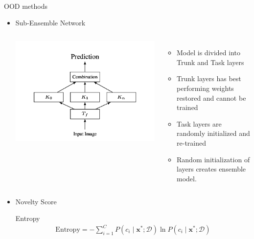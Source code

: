 \documentclass[10pt, aspectratio=169]{beamer}
\begin{document}
\begin{frame}[allowframebreaks]{OOD methods}
\begin{itemize}
\begin{itemize}
            \item Sub-Ensemble Network 
            \begin{columns}
                   \centering
                   \includegraphics[scale=0.275]{images/subensembles.png}
                    \begin{itemize}
                        \item Model is divided into Trunk and Task layers
                        \item Trunk layers has best performing weights restored and cannot be trained
                        \item Task layers are randomly initialized and re-trained
                        \item Random initialization of layers creates ensemble model. 
                    \end{itemize}
            \end{columns} \newpage
            \item Novelty Score \newline
            
            Entropy
            \begin{equation}
                \label{Entropy}
                \begin{array}{l}
                    \text{Entropy} =-\sum_{i=1}^{C} P\left(c_i \mid \mathbf{x}^{*} ; \mathcal{D}\right) \ln P\left(c_i \mid \mathbf{x}^{*} ; \mathcal{D}\right) 
                \end{array}
            \end{equation} \newline


\end{itemize}
\end{itemize}
\end{frame}
\end{document}
